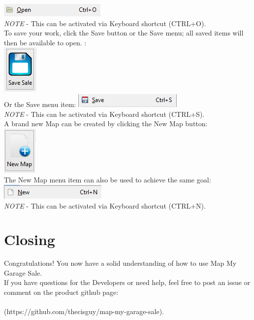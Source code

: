 \documentclass{report}
\begin{document}
\includegraphics{openfilemenuitem.png}\\

\emph{NOTE} - This can be activated via Keyboard shortcut (CTRL+O).\\

To save your work, click the Save button or the Save menu; all saved items will
then be available to open.  :\\

\includegraphics{savebutton.png}\\

Or the Save menu item:
\includegraphics{savemenuitem.png}\\

\emph{NOTE} - This can be activated via Keyboard shortcut (CTRL+S).\\

A brand new Map can be created by clicking the New Map button:\\

\includegraphics{newmapbutton.png}\\

The New Map menu item can also be used to achieve the same goal:\\

\includegraphics{newmapitem.png}\\

\emph{NOTE} - This can be activated via Keyboard shortcut (CTRL+N).\\

\chapter{Closing}

Congratulations! You now have a solid understanding of how to use Map My Garage Sale.\\

If you have questions for the Developers or need help, feel free to post an issue or comment
on the product github page:\\\\ (https://github.com/thecisguy/map-my-garage-sale).
\end{document}
